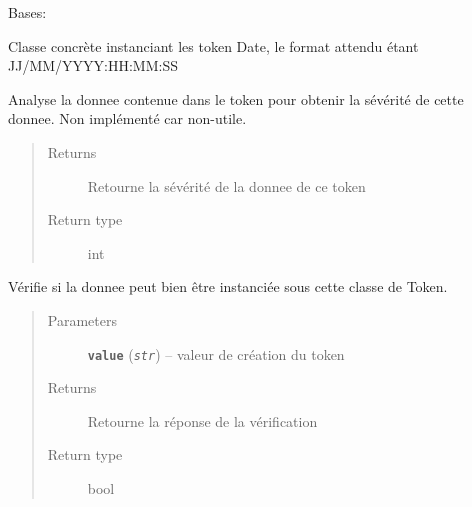 \documentclass[letterpaper,10pt,english]{sphinxmanual}
\begin{document}

\begin{fulllineitems}
\label{loganalyser:loganalyser.token.Date}
Bases: {\hyperref[loganalyser:loganalyser.token.Token]{\emph{}}}

Classe concrète instanciant les token Date, le format attendu étant JJ/MM/YYYY:HH:MM:SS

\begin{fulllineitems}
\label{loganalyser:loganalyser.token.Date._Token__analyse}
Analyse la donnee contenue dans le token pour obtenir la sévérité de cette donnee. Non implémenté car non-utile.
\begin{quote}\begin{description}
\item[{Returns}] \leavevmode
Retourne la sévérité de la donnee de ce token

\item[{Return type}] \leavevmode
int

\end{description}\end{quote}

\end{fulllineitems}


\begin{fulllineitems}
\label{loganalyser:loganalyser.token.Date._Token__verifier_type}
Vérifie si la donnee peut bien être instanciée sous cette classe de Token.
\begin{quote}\begin{description}
\item[{Parameters}] \leavevmode
\textbf{\texttt{value}} (\emph{\texttt{str}}) -- valeur de création du token

\item[{Returns}] \leavevmode
Retourne la réponse de la vérification

\item[{Return type}] \leavevmode
bool

\end{description}\end{quote}

\end{fulllineitems}


\end{fulllineitems}
\end{document}
